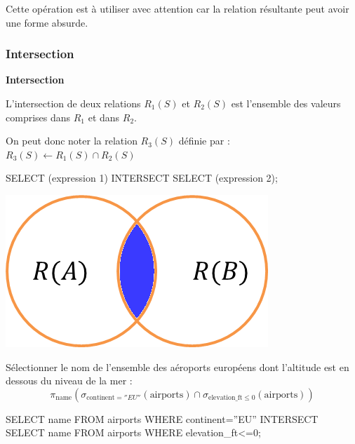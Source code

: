 \documentclass[10pt,fleqn]{article} %
\begin{document}
\begin{rem}
Cette opération est à utiliser avec attention car la relation résultante peut avoir une forme absurde.
\end{rem}

\subsubsection{Intersection}
\begin{defi}
\begin{minipage}[c]{.75\linewidth}
\textbf{Intersection}

L'intersection de deux relations $R_1(S)$ et $R_2(S)$ est l'ensemble des valeurs comprises dans $R_1$ et dans $R_2$. 

On peut donc noter la relation $R_3(S)$ définie par : $R_3(S)\leftarrow R_1(S)\cap R_2(S)$

\begin{envsql}
\begin{sql}
SELECT  (expression 1) INTERSECT SELECT (expression 2);
\end{sql}
\end{envsql}
\end{minipage}\hfill
\begin{minipage}[c]{.2\linewidth}
\begin{center}
\includegraphics[width=.95\textwidth]{images/inter}
\end{center}
\end{minipage}
\end{defi}

\begin{exemple}
Sélectionner le nom de l'ensemble des aéroports européens dont l'altitude est en dessous du niveau de la mer :
\ifprof
$$
\pi_{\text{name}}\left(\sigma_{\text{continent}=''EU''}(\text{airports}) \cap \sigma_{\text{elevation\_ft}\leq0}(\text{airports}) \right)
$$
\begin{envsql}
\begin{sql}
SELECT name FROM airports WHERE continent=''EU''
    INTERSECT SELECT name FROM airports WHERE elevation_ft<=0;
\end{sql}
\end{envsql}
\else
\vspace{4cm}
\fi

\end{exemple}
\end{document}
